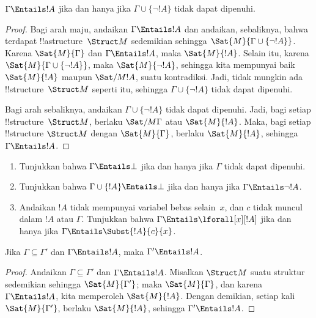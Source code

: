 \documentclass[../../../include/open-logic-section]{subfiles}
\begin{document}
\begin{prop}
$\Gamma \Entails !A$ jika dan hanya jika $\Gamma \cup \{\lnot !A\}$ tidak
dapat dipenuhi.
\end{prop}

\begin{proof}
Bagi arah maju, andaikan $\Gamma \Entails !A$ dan andaikan, sebaliknya,
bahwa terdapat !!a{structure}~$\Struct M$ sedemikian sehingga
$\Sat{M}{\Gamma \cup \{ \lnot !A \}}$. Karena $\Sat{M}{\Gamma}$ dan
$\Gamma \Entails !A$, maka $\Sat{M}{!A}$. Selain itu, karena
$\Sat{M}{\Gamma\cup \{ \lnot !A \}}$, maka $\Sat{M}{\lnot !A}$, sehingga
kita mempunyai baik $\Sat{M}{!A}$ maupun $\Sat/{M}{!A}$, suatu
kontradiksi. Jadi, tidak mungkin ada !!{structure}~$\Struct M$ seperti itu,
sehingga $\Gamma \cup \{ \lnot !A \}$ tidak dapat dipenuhi.

Bagi arah sebaliknya, andaikan $\Gamma \cup \{ \lnot !A \}$ tidak dapat
dipenuhi. Jadi, bagi setiap !!{structure}~$\Struct M$, berlaku
$\Sat/{M}{\Gamma}$ atau $\Sat{M}{!A}$. Maka, bagi setiap !!{structure}
$\Struct M$ dengan $\Sat{M}{\Gamma}$, berlaku $\Sat{M}{!A}$, sehingga
$\Gamma \Entails !A$.
\end{proof}

\begin{prob}
\begin{enumerate}
\item Tunjukkan bahwa $\Gamma \Entails \bot$ jika dan hanya jika $\Gamma$
  tidak dapat dipenuhi.
\item Tunjukkan bahwa $\Gamma \cup \{!A\} \Entails \bot$ jika dan hanya jika
  $\Gamma \Entails \lnot !A$.
\item Andaikan $!A$ tidak mempunyai variabel bebas selain~$x$, dan $c$ tidak
  muncul dalam $!A$ atau $\Gamma$. Tunjukkan bahwa
  $\Gamma \Entails \lforall[x][!A]$ jika dan hanya jika
  $\Gamma \Entails \Subst{!A}{c}{x}$.
\end{enumerate}
\end{prob}

\begin{prop}
Jika $\Gamma \subseteq \Gamma'$ dan $\Gamma \Entails !A$, maka
$\Gamma' \Entails !A$.
\end{prop}

\begin{proof}
Andaikan $\Gamma \subseteq \Gamma'$ dan $\Gamma \Entails !A$. Misalkan
$\Struct M$ suatu struktur sedemikian sehingga $\Sat{M}{\Gamma'}$; maka
$\Sat{M}{\Gamma}$, dan karena $\Gamma \Entails !A$, kita memperoleh
$\Sat{M}{!A}$. Dengan demikian, setiap kali $\Sat{M}{\Gamma'}$, berlaku
$\Sat{M}{!A}$, sehingga $\Gamma' \Entails !A$.
\end{proof}
\end{document}
